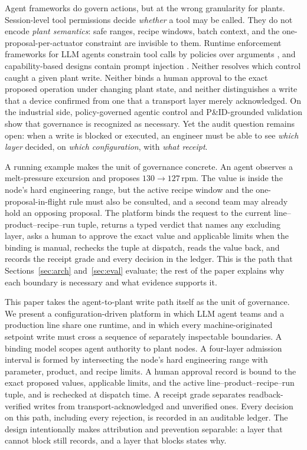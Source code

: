 Agent frameworks do govern actions, but at the wrong granularity for plants.
Session-level tool permissions decide \emph{whether} a tool may be called.
They do not encode \emph{plant semantics}: safe ranges, recipe windows,
batch context, and the one-proposal-per-actuator constraint are invisible
to them. Runtime
enforcement frameworks for LLM agents constrain tool calls by policies over
arguments \cite{wang2025agentspec}, and capability-based designs contain
prompt injection \cite{debenedetti2025camel}. Neither resolves which
control caught a given plant write. Neither binds a human approval to the
exact proposed operation under changing plant state, and neither
distinguishes a write that a device confirmed from one that a transport
layer merely acknowledged. On the industrial side, policy-governed agentic control
\cite{lin2026agentic} and P\&ID-grounded validation \cite{schall2026safe}
show that governance is recognized as necessary. Yet the audit question
remains open: when a write is blocked or executed, an engineer must be able
to see \emph{which layer} decided, on \emph{which configuration}, with
\emph{what receipt}.

A running example makes the unit of governance concrete. An agent observes
a melt-pressure excursion and proposes $130\to127$\,rpm. The value is
inside the node's hard engineering range, but the active recipe window and
the one-proposal-in-flight rule must also be consulted, and a second team
may already hold an opposing proposal. The platform binds the request to
the current line--product--recipe--run tuple, returns a typed verdict that
names any excluding layer, asks a human to approve the exact value and
applicable limits when the binding is manual, rechecks the tuple at
dispatch, reads the value back, and records the receipt grade and every
decision in the ledger. This is the path that Sections~\ref{sec:arch}
and~\ref{sec:eval} evaluate; the rest of the paper explains why each
boundary is necessary and what evidence supports it.

This paper takes the agent-to-plant write path itself as the unit of
governance. We present a configuration-driven platform in which LLM agent
teams and a production line share one runtime, and in which every
machine-originated setpoint write must cross a sequence of separately
inspectable boundaries. A binding model scopes agent authority to plant
nodes. A four-layer admission interval is formed by intersecting the node's
hard engineering range with parameter, product, and recipe limits. A human
approval record is bound to the exact proposed values, applicable limits,
and the active line--product--recipe--run tuple, and is rechecked at
dispatch time. A receipt grade separates readback-verified writes from
transport-acknowledged and unverified ones. Every decision on this path,
including every rejection, is recorded in an auditable ledger. The design
intentionally makes attribution and prevention separable: a layer that
cannot block still records, and a layer that blocks states why.

